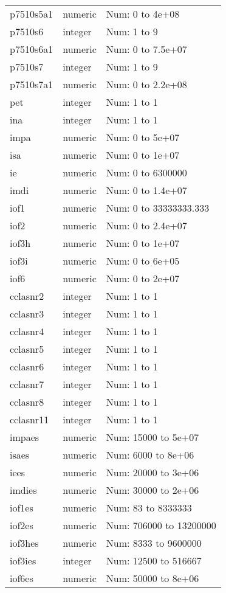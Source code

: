 \begin{table}[!htbp]
\begin{tabular}{p{}p{}p{}}
p7510s5a1 & numeric & Num: 0 to 4e+08 \\ 
p7510s6 & integer & Num: 1 to 9 \\ 
p7510s6a1 & numeric & Num: 0 to 7.5e+07 \\ 
p7510s7 & integer & Num: 1 to 9 \\ 
p7510s7a1 & numeric & Num: 0 to 2.2e+08 \\ 
pet & integer & Num: 1 to 1 \\ 
ina & integer & Num: 1 to 1 \\ 
impa & numeric & Num: 0 to 5e+07 \\ 
isa & numeric & Num: 0 to 1e+07 \\ 
ie & numeric & Num: 0 to 6300000 \\ 
imdi & numeric & Num: 0 to 1.4e+07 \\ 
iof1 & numeric & Num: 0 to 33333333.333 \\ 
iof2 & numeric & Num: 0 to 2.4e+07 \\ 
iof3h & numeric & Num: 0 to 1e+07 \\ 
iof3i & numeric & Num: 0 to 6e+05 \\ 
iof6 & numeric & Num: 0 to 2e+07 \\ 
cclasnr2 & integer & Num: 1 to 1 \\ 
cclasnr3 & integer & Num: 1 to 1 \\ 
cclasnr4 & integer & Num: 1 to 1 \\ 
cclasnr5 & integer & Num: 1 to 1 \\ 
cclasnr6 & integer & Num: 1 to 1 \\ 
cclasnr7 & integer & Num: 1 to 1 \\ 
cclasnr8 & integer & Num: 1 to 1 \\ 
cclasnr11 & integer & Num: 1 to 1 \\ 
impaes & numeric & Num: 15000 to 5e+07 \\ 
isaes & numeric & Num: 6000 to 8e+06 \\ 
iees & numeric & Num: 20000 to 3e+06 \\ 
imdies & numeric & Num: 30000 to 2e+06 \\ 
iof1es & numeric & Num: 83 to 8333333 \\ 
iof2es & numeric & Num: 706000 to 13200000 \\ 
iof3hes & numeric & Num: 8333 to 9600000 \\ 
iof3ies & integer & Num: 12500 to 516667 \\ 
iof6es & numeric & Num: 50000 to 8e+06 \\ 

\end{tabular}
\end{table}
